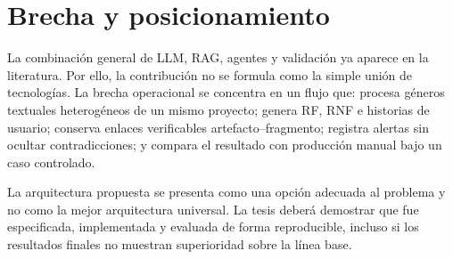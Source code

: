 \section{Brecha y posicionamiento}

La combinación general de LLM, RAG, agentes y validación ya aparece en la literatura. Por ello, la contribución no se formula como la simple unión de tecnologías. La brecha operacional se concentra en un flujo que: procesa géneros textuales heterogéneos de un mismo proyecto; genera RF, RNF e historias de usuario; conserva enlaces verificables artefacto--fragmento; registra alertas sin ocultar contradicciones; y compara el resultado con producción manual bajo un caso controlado.

La arquitectura propuesta se presenta como una opción adecuada al problema y no como la mejor arquitectura universal. La tesis deberá demostrar que fue especificada, implementada y evaluada de forma reproducible, incluso si los resultados finales no muestran superioridad sobre la línea base.

